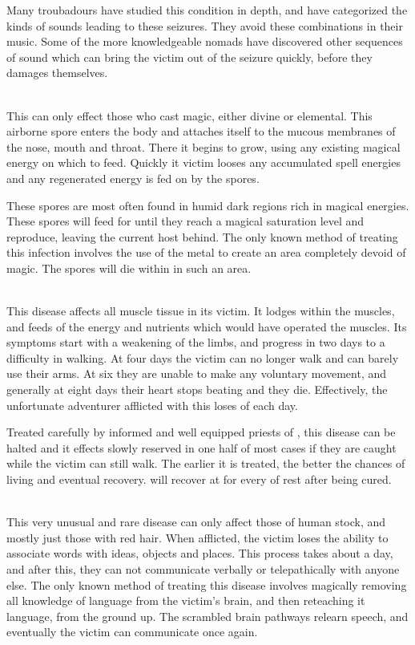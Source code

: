 \begin{multicols*}{2}
Many troubadours have studied this condition in depth, and have categorized the kinds of sounds leading to these seizures. They avoid these combinations in their music. Some of the more knowledgeable nomads have discovered other sequences of sound which can bring the victim out of the seizure quickly, before they damages themselves.

\\
This can only effect those who cast magic, either divine or elemental. This airborne spore enters the body and attaches itself to the mucous membranes of the nose, mouth and throat. There it begins to grow, using any existing magical energy on which to feed. Quickly it victim looses any accumulated spell energies and any regenerated energy is fed on by the spores.

These spores are most often found in humid dark regions rich in magical energies. These spores will feed for  until they reach a magical saturation level and reproduce, leaving the current host behind. The only known method of treating this infection involves the use of the metal  to create an area completely devoid of magic. The spores will die within  in such an area.

\\
This disease affects all muscle tissue in its victim. It lodges within the muscles, and feeds of the energy and nutrients which would have operated the muscles. Its symptoms start with a weakening of the limbs, and progress in two days to a difficulty in walking. At four days the victim can no longer walk and can barely use their arms. At six they are unable to make any voluntary movement, and generally at eight days their heart stops beating and they die. Effectively, the unfortunate adventurer afflicted with this loses  of \STR each day.

Treated carefully by informed and well equipped priests of , this disease can be halted and it effects slowly reserved in one half of most cases if they are caught while the victim can still walk. The earlier it is treated, the better the chances of living and eventual recovery. \STR will recover at  for every  of rest after being cured.

\\
This very unusual and rare disease can only affect those of human stock, and mostly just those with red hair. When afflicted, the victim loses the ability to associate words with ideas, objects and places. This process takes about a day, and after this, they can not communicate verbally or telepathically with anyone else. The only known method of treating this disease involves magically removing all knowledge of language from the victim's brain, and then reteaching it language, from the ground up. The scrambled brain pathways relearn speech, and eventually the victim can communicate once again.
\end{multicols*}
